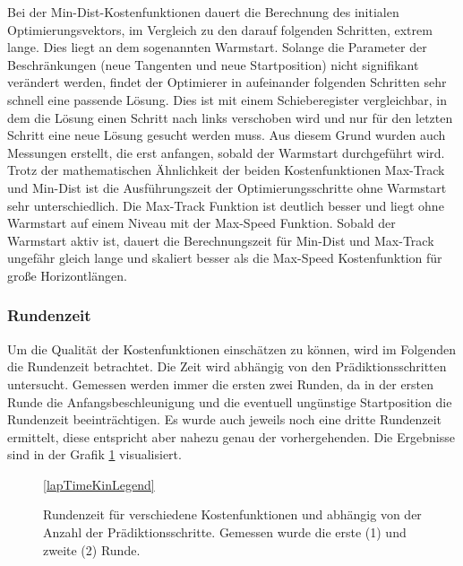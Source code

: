 \documentclass{like}
\begin{document}
Bei der Min-Dist-Kostenfunktionen dauert die Berechnung des initialen Op\-ti\-mie\-rungs\-vek\-tors, im Vergleich zu den darauf folgenden Schritten, extrem lange. Dies liegt an dem sogenannten Warmstart. Solange die Parameter der Beschränkungen (neue Tangenten und neue Start\-po\-si\-tion) nicht signifikant verändert werden, findet der Optimierer in aufeinander folgenden Schritten sehr schnell eine passende Lösung. Dies ist mit einem  Schieberegister ver\-gleich\-bar, in dem die Lösung einen Schritt nach links verschoben wird und nur für den letzten Schritt eine neue Lösung gesucht werden muss. Aus diesem Grund wurden auch Messungen erstellt, die erst anfangen, sobald der Warmstart durchgeführt wird. 
Trotz der ma\-the\-ma\-tisch\-en Ähnlichkeit der beiden Kostenfunktionen Max-Track und Min-Dist ist die Ausführungszeit der Optimierungsschritte ohne Warmstart sehr unterschiedlich. Die Max-Track Funktion ist deutlich besser und liegt ohne Warmstart auf einem Niveau mit der Max-Speed Funktion.
Sobald der Warmstart aktiv ist, dauert die Berechnungszeit für Min-Dist und Max-Track ungefähr gleich lange und skaliert besser als die Max-Speed Kostenfunktion für große Horizontlängen.

\subsubsection{Rundenzeit}
\label{laptime}
Um die Qualität der Kostenfunktionen einschätzen zu können, wird im Folgenden die Rundenzeit betrachtet. Die Zeit wird abhängig von den Prädiktionsschritten untersucht. Gemessen werden immer die ersten zwei Runden, da in der ersten Runde die Anfangs\-be\-schleu\-ni\-gung und die eventuell ungünstige Startposition die Rundenzeit beeinträchtigen. Es wurde auch jeweils noch eine dritte Rundenzeit ermittelt, diese entspricht aber nahezu genau der vorhergehenden. Die Ergebnisse sind in der Grafik \ref{fig:lapTimeKin} visualisiert.

\begin{figure}[ht!]
	\centering
	 
	\ref{lapTimeKinLegend}
	\caption{Rundenzeit für verschiedene Kostenfunktionen und abhängig von der Anzahl der Prädiktionsschritte. Gemessen wurde die erste (1) und zweite (2) Runde.}
	\label{fig:lapTimeKin}
\end{figure}
\end{document}
